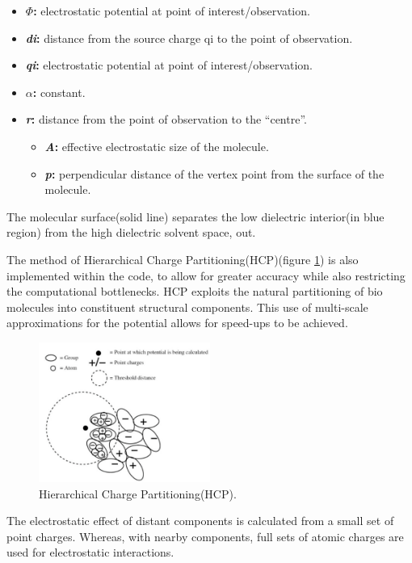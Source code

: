 \begin{itemize}
    \item \textbf{$\Phi$:} electrostatic potential at point of interest/observation.
    \item \textbf{\emph{di}:} distance from the source charge qi to the point of observation.
    \item \textbf{\emph{qi}:} electrostatic potential at point of interest/observation.
    \item \textbf{$\alpha$:} constant.
    \item \textbf{\emph{r}:} distance from the point of observation to the 
                            ``centre''.
    \begin{itemize}
        \item \textbf{\emph{A}:} effective electrostatic size of the molecule.
        \item \textbf{\emph{p}:} perpendicular distance of the vertex point from the 
                                surface of the molecule.
    \end{itemize}
\end{itemize}

\par{The molecular surface(solid line) separates the low dielectric 
    interior(\in in blue region) from the high dielectric solvent space, 
    \in out.}

\par{The method of Hierarchical Charge Partitioning(HCP)(figure \ref{hpc})
    is also implemented within the code, to allow for greater 
    accuracy while also restricting the computational bottlenecks. 
    HCP exploits the natural partitioning of bio molecules into constituent 
    structural components. This use of multi-scale 
    approximations for the potential allows for speed-ups to be achieved.}

\begin{figure}[!h]
    \centering
    \includegraphics[width=0.5\textwidth]{figures/hpc.png}
    \caption{Hierarchical Charge Partitioning(HCP)\cite{nbody_gpu}.}
    \label{hpc}
\end{figure}

\par{The electrostatic effect of distant components is calculated from 
    a small set of point charges. Whereas, with nearby components, 
    full sets of atomic charges are used for electrostatic interactions.}





